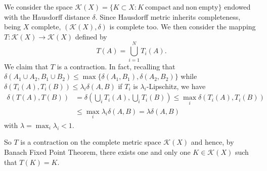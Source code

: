 \documentclass[12pt]{article}
\theoremstyle{remark}
\begin{document}
We consider the space $\mathcal K(X)=\{K\subset X\colon K\mathrm{\ compact\ and\ non\ empty}\}$ endowed with the Hausdorff distance $\delta$.
Since Hausdorff metric inherits completeness, being $X$ complete, $(\mathcal K(X),\delta)$ is complete too. We then consider the mapping $T\colon \mathcal K(X) \to \mathcal K(X)$ defined by
\[
  T(A) = \bigcup_{i=1}^N T_i(A).
\]
We claim that $T$ is a contraction. In fact, recalling that $\delta(A_1\cup A_2, B_1\cup B_2) \le \max\{\delta(A_1,B_1),\delta(A_2,B_2)\}$ while $\delta(T_i(A),T_i(B))\le \lambda_i \delta(A,B)$ if $T_i$ is $\lambda_i$-Lipschitz, we have
\begin{align*}
  \delta(T(A),T(B))
  &= \delta(\bigcup_i T_i(A), \bigcup_i T_i(B))
  \le \max_i \delta(T_i(A),T_i(B))\\
  &\le \max_i \lambda_i \delta(A,B) = \lambda \delta(A,B)
\end{align*}
with $\lambda=\max_i \lambda_i <1$. 

So $T$ is a contraction on the complete metric space $\mathcal K(X)$ and hence,
by Banach Fixed Point Theorem, there exists one and only one $K\in\mathcal K(X)$ such that $T(K)=K$.




\end{document}
